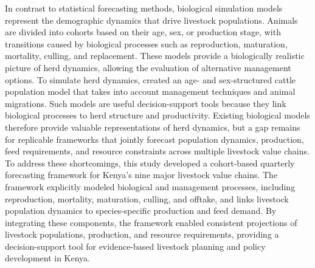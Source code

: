 In contrast to statistical forecasting methods, biological simulation models represent the demographic dynamics that drive livestock populations. Animals are divided into cohorts based on their age, sex, or production stage, with transitions caused by biological processes such as reproduction, maturation, mortality, culling, and replacement. These models provide a biologically realistic picture of herd dynamics, allowing the evaluation of alternative management options. To simulate herd dynamics, \cite{simoyHerdDynamicsAge2021} created an age- and sex-structured cattle population model that takes into account management techniques and animal migrations. Such models are useful decision-support tools because they link biological processes to herd structure and productivity. Existing biological models therefore provide valuable representations of herd dynamics, but a gap remains for replicable frameworks that jointly forecast population dynamics, production, feed requirements, and resource constraints across multiple livestock value chains.
To address these shortcomings, this study developed a cohort-based quarterly forecasting framework for Kenya's nine major livestock value chains. The framework explicitly modeled biological and management processes, including reproduction, mortality, maturation, culling, and offtake, and links livestock population dynamics to species-specific production and feed demand. By integrating these components, the framework enabled consistent projections of livestock populations, production, and resource requirements, providing a decision-support tool for evidence-based livestock planning and policy development in Kenya.







